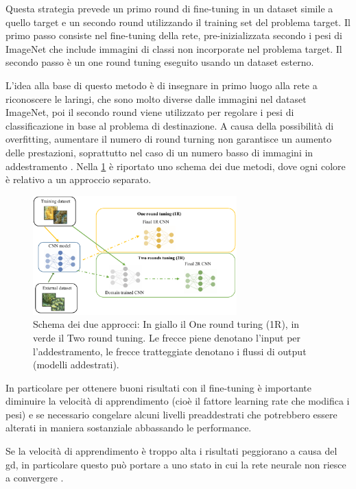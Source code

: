 Questa strategia prevede un primo round di fine-tuning in un dataset simile a quello target e un secondo round utilizzando il training set del problema target. Il primo passo consiste nel fine-tuning della rete, pre-inizializzata secondo i pesi di ImageNet che include immagini di classi non incorporate nel problema target. Il secondo passo è un one round tuning eseguito usando un  dataset esterno. 

L'idea alla base di questo metodo è di insegnare in primo luogo alla rete a riconoscere le laringi, che sono molto diverse dalle immagini nel dataset ImageNet, poi il secondo round viene utilizzato per regolare i pesi di classificazione in base al problema di destinazione. A causa della possibilità di \gls{overfitting}, aumentare il numero di round turning non garantisce un aumento delle prestazioni, soprattutto nel caso di un numero basso di immagini in addestramento \cite{lumini_plankton}. Nella \cref{fig:tl_2rt}  è riportato uno schema dei due metodi, dove ogni colore è relativo a un approccio separato. 

\begin{figure}[ht]
    \centering
    \includegraphics[width=0.7\textwidth]{transfer-learning/tl_2rt.pdf}
    \caption[Schema dei due approcci: In giallo il One round turing (1R), in verde il Two round tuning]{Schema dei due approcci: In giallo il One round turing (1R), in verde il Two round tuning. Le frecce piene denotano l'input per l'addestramento, le frecce tratteggiate denotano i flussi di output (modelli addestrati).}
    \label{fig:tl_2rt}
\end{figure}

In particolare per ottenere buoni risultati con il fine-tuning è importante diminuire la velocità di apprendimento (cioè il fattore learning rate che modifica i pesi) e se necessario congelare alcuni livelli preaddestrati che potrebbero essere alterati in maniera sostanziale abbassando le performance.

Se la velocità di apprendimento è troppo alta i risultati peggiorano a causa del \gls{gd}, in particolare questo può portare a uno stato in cui la rete neurale non riesce a convergere \cite{joel_ft_tl_lfs} \cite{joel_tl}.

